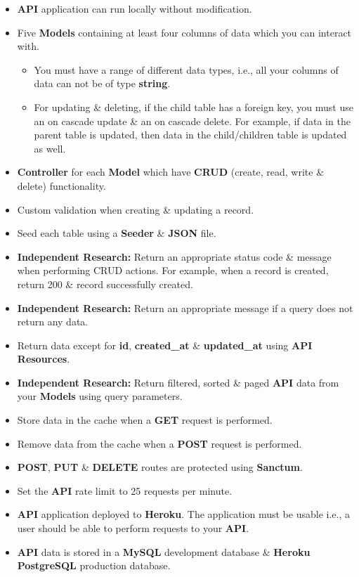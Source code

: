 \documentclass{article}
\begin{document}
\begin{itemize}
	\item \textbf{API} application can run locally without modification.
	\item Five \textbf{Models} containing at least four columns of data which you can interact with. 
	\begin{itemize}
    \item You must have a range of different data types, i.e., all your columns of data can not be of type \textbf{string}.
    \item For updating \& deleting, if the child table has a foreign key, you must use an on cascade update \& an on cascade delete. For example, if data in the parent table is updated, then data in the child/children table is updated as well.
  \end{itemize}
	\item \textbf{Controller} for each \textbf{Model} which have \textbf{CRUD} (create, read, write \& delete) functionality. 
	\item Custom validation when creating \& updating a record. 
	\item Seed each table using a \textbf{Seeder} \& \textbf{JSON} file.
	\item \textbf{Independent Research:} Return an appropriate status code \& message when performing CRUD actions. For example, when a record is created, return 200 \& record successfully created. 
  \item \textbf{Independent Research:} Return an appropriate message if a query does not return any data.
	\item Return data except for \textbf{id}, \textbf{created\_at} \& \textbf{updated\_at} using \textbf{API Resources}.
	\item \textbf{Independent Research:} Return filtered, sorted \& paged \textbf{API} data from your \textbf{Models} using query parameters.
	\item Store data in the cache when a \textbf{GET} request is performed. 
	\item Remove data from the cache when a \textbf{POST} request is performed.  
	\item \textbf{POST}, \textbf{PUT} \& \textbf{DELETE} routes are protected using \textbf{Sanctum}.
	\item Set the \textbf{API} rate limit to 25 requests per minute.
	\item \textbf{API} application deployed to \textbf{Heroku}. The application must be usable i.e., a user should be able to perform requests to your \textbf{API}.
	\item \textbf{API} data is stored in a \textbf{MySQL} development database \& \textbf{Heroku PostgreSQL} production database.	
\end{itemize}
\end{document}

